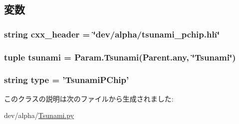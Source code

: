 \subsection{変数}
\hypertarget{classTsunami_1_1TsunamiPChip_a17da7064bc5c518791f0c891eff05fda}{
\subsubsection[{cxx\_\-header}]{\setlength{\rightskip}{0pt plus 5cm}string {\bf cxx\_\-header} = \char`\"{}dev/alpha/tsunami\_\-pchip.hh\char`\"{}}}
\label{classTsunami_1_1TsunamiPChip_a17da7064bc5c518791f0c891eff05fda}
\hypertarget{classTsunami_1_1TsunamiPChip_aabfaa1eda1546a625690c7a59b7fed04}{
\subsubsection[{tsunami}]{\setlength{\rightskip}{0pt plus 5cm}tuple {\bf tsunami} = Param.Tsunami(Parent.any, \char`\"{}Tsunami\char`\"{})}}
\label{classTsunami_1_1TsunamiPChip_aabfaa1eda1546a625690c7a59b7fed04}
\hypertarget{classTsunami_1_1TsunamiPChip_acce15679d830831b0bbe8ebc2a60b2ca}{
\subsubsection[{type}]{\setlength{\rightskip}{0pt plus 5cm}string {\bf type} = '{\bf TsunamiPChip}'}}
\label{classTsunami_1_1TsunamiPChip_acce15679d830831b0bbe8ebc2a60b2ca}


このクラスの説明は次のファイルから生成されました:\begin{DoxyCompactItemize}
\item 
dev/alpha/\hyperlink{Tsunami_8py}{Tsunami.py}\end{DoxyCompactItemize}
